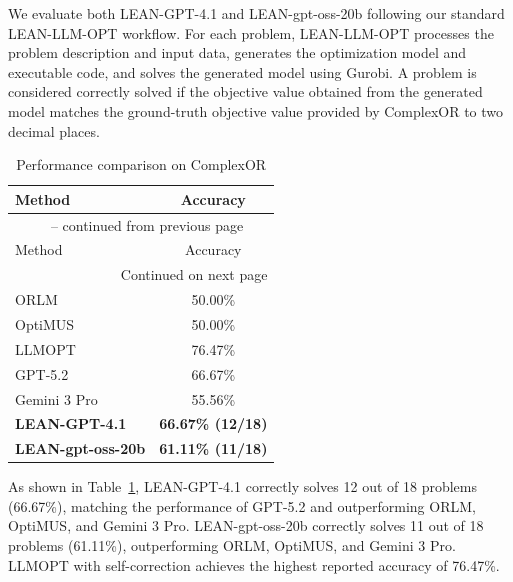 \documentclass[11pt]{article}
\begin{document}
\begin{enumerate}[label=(AssoE.\arabic*),leftmargin=*]
\begin{enumerate}[label=(R2.Major.\arabic*),leftmargin=*]
We evaluate both LEAN-GPT-4.1 and LEAN-gpt-oss-20b following our standard LEAN-LLM-OPT workflow. For each problem, LEAN-LLM-OPT processes the problem description and input data, generates the optimization model and executable code, and solves the generated model using Gurobi. A problem is considered correctly solved if the objective value obtained from the generated model matches the ground-truth objective value provided by ComplexOR to two decimal places.

\begin{longtable}{lc}
\caption{Performance comparison on ComplexOR}
\label{tab:complexor_results} \\

\toprule
Method & Accuracy \\
\midrule
\endfirsthead

\multicolumn{2}{c}{
\tablename\ \thetable{} -- continued from previous page
} \\
\toprule
Method & Accuracy \\
\midrule
\endhead

\midrule
\multicolumn{2}{r}{Continued on next page} \\
\endfoot

\bottomrule
\endlastfoot

ORLM \citep{ding2026or}
& 50.00\% \\

OptiMUS \citep{zhang2026dual}
& 50.00\% \\

LLMOPT \citep{shu2025llmopt}
& 76.47\% \\

GPT-5.2 \citep{monteiro2026optiagent}
& 66.67\% \\

Gemini 3 Pro \citep{li2026constructing}
& 55.56\% \\

\midrule

\textbf{LEAN-GPT-4.1}
& \textbf{66.67\% (12/18)} \\

\textbf{LEAN-gpt-oss-20b}
& \textbf{61.11\% (11/18)} \\

\end{longtable}

As shown in Table~\ref{tab:complexor_results}, LEAN-GPT-4.1 correctly solves 12 out of 18 problems (66.67\%), matching the performance of GPT-5.2 and outperforming ORLM, OptiMUS, and Gemini 3 Pro. LEAN-gpt-oss-20b correctly solves 11 out of 18 problems (61.11\%), outperforming ORLM, OptiMUS, and Gemini 3 Pro. LLMOPT with self-correction achieves the highest reported accuracy of 76.47\%.


\end{enumerate}
\end{enumerate}
\end{document}
